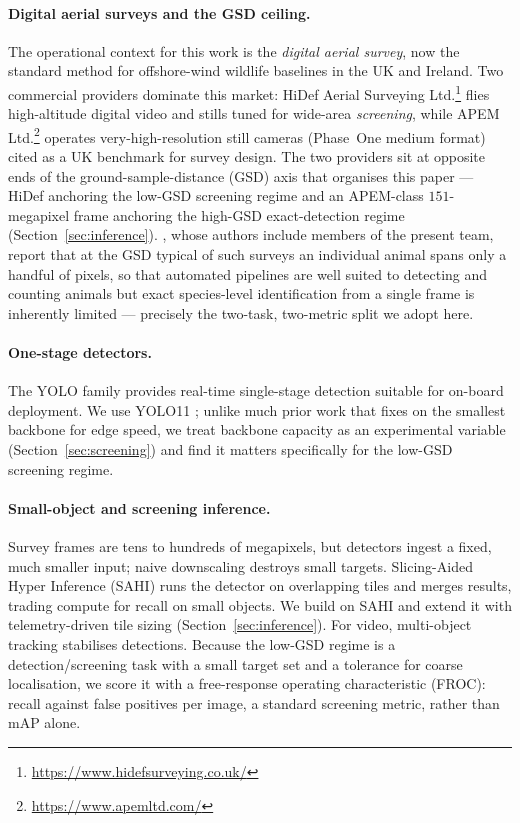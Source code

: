 \documentclass[11pt,a4paper]{article}
\newcommand{\map}{mAP}
\begin{document}
\paragraph{Digital aerial surveys and the GSD ceiling.}
The operational context for this work is the \emph{digital aerial survey}, now
the standard method for offshore-wind wildlife baselines in the UK and Ireland.
Two commercial providers dominate this market: HiDef Aerial Surveying
Ltd.\footnote{\url{https://www.hidefsurveying.co.uk/}} flies high-altitude
digital video and stills tuned for wide-area \emph{screening}, while
APEM Ltd.\footnote{\url{https://www.apemltd.com/}} operates very-high-resolution
still cameras (Phase~One medium format) cited as a UK benchmark for survey
design. The two providers sit at opposite ends of the ground-sample-distance
(GSD) axis that organises this paper --- HiDef anchoring the low-GSD screening
regime and an APEM-class $151$-megapixel frame anchoring the high-GSD
exact-detection regime (Section~\ref{sec:inference}). \citet{bartlett2025offshore},
whose authors include members of the present team, report that at the GSD
typical of such surveys an individual animal spans only a handful of pixels, so
that automated pipelines are well suited to detecting and counting animals but
exact species-level identification from a single frame is inherently limited ---
precisely the two-task, two-metric split we adopt here.

\paragraph{One-stage detectors.}
The YOLO family \citep{redmon2016yolo,ultralytics2023yolo} provides real-time
single-stage detection suitable for on-board deployment. We use YOLO11
\citep{khanam2024yolov11}; unlike much prior work that fixes on the smallest
backbone for edge speed, we treat backbone capacity as an experimental variable
(Section~\ref{sec:screening}) and find it matters specifically for the low-GSD
screening regime.

\paragraph{Small-object and screening inference.}
Survey frames are tens to hundreds of megapixels, but detectors ingest a fixed,
much smaller input; naive downscaling destroys small targets. Slicing-Aided
Hyper Inference (SAHI) \citep{akyon2022sahi} runs the detector on overlapping
tiles and merges results, trading compute for recall on small objects. We build
on SAHI and extend it with telemetry-driven tile sizing
(Section~\ref{sec:inference}). For video, multi-object tracking \citep{aharon2022botsort}
stabilises detections. Because the low-GSD regime is a detection/screening task
with a small target set and a tolerance for coarse localisation, we score it
with a free-response operating characteristic (FROC): recall against false
positives per image, a standard screening metric, rather than \map{} alone.
\end{document}

